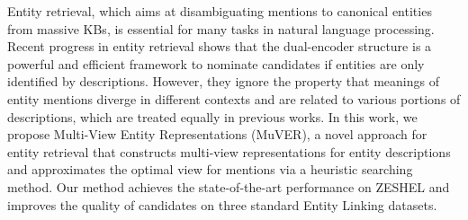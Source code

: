 Entity retrieval, which aims at disambiguating mentions to canonical entities from massive KBs, is essential for many tasks in natural language processing. Recent progress in entity retrieval shows that the dual-encoder structure is a powerful and efficient framework to nominate candidates if entities are only identified by descriptions. However, they ignore the property that meanings of entity mentions diverge in different contexts and are related to various portions of descriptions, which are treated equally in previous works. In this work, we propose Multi-View Entity Representations (MuVER), a novel approach for entity retrieval that constructs multi-view representations for entity descriptions and approximates the optimal view for mentions via a heuristic searching method. Our method achieves the state-of-the-art performance on ZESHEL and improves the quality of candidates on three standard Entity Linking datasets.
